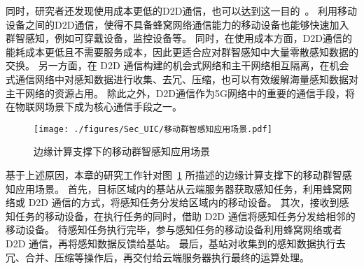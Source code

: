 同时，研究者还发现使用成本更低的D2D通信，也可以达到这一目的~\cite{DBLP:journals/puc/WangLL17}。
利用移动设备之间的D2D通信，使得不具备蜂窝网络通信能力的移动设备也能够快速加入群智感知，例如可穿戴设备，监控设备等。
同时，在使用成本方面，D2D通信的能耗成本更低且不需要服务成本，因此更适合应对群智感知中大量零散感知数据的交换。
另一方面，在 D2D 通信构建的机会式网络和主干网络相互隔离，在机会式通信网络中对感知数据进行收集、去冗、压缩，也可以有效缓解海量感知数据对主干网络的资源占用。
除此之外，D2D通信作为5G网络中的重要的通信手段，将在物联网场景下成为核心通信手段之一。


\begin{figure}[!b]
  \centering
  \vspace{-1em}
  \texttt{[image: ./figures/Sec\_UIC/移动群智感知应用场景.pdf]}
  \vspace{-0.5em}
  \caption{边缘计算支撑下的移动群智感知应用场景}
  \vspace{-1em}
  \label{Figure_UIC_MCS}
\end{figure}

基于上述原因，本章的研究工作针对图~\ref{Figure_UIC_MCS} 所描述的边缘计算支撑下的移动群智感知应用场景。
首先，目标区域内的基站从云端服务器获取感知任务，利用蜂窝网络或 D2D 通信的方式，将感知任务分发给区域内的移动设备。
其次，接收到感知任务的移动设备，在执行任务的同时，借助 D2D 通信将感知任务分发给相邻的移动设备。
待感知任务执行完毕，参与感知任务的移动设备利用蜂窝网络或者 D2D 通信，再将感知数据反馈给基站。
最后，基站对收集到的感知数据执行去冗、合并、压缩等操作后，再交付给云端服务器执行最终的运算处理。


